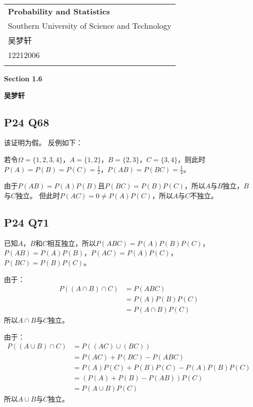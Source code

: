 \documentclass[a4paper,12pt]{ctexart}
\begin{document}
\thispagestyle{empty} %

\begin{tabular}{p{15.5cm}}
{\large \bf Probability and Statistics} \\
Southern University of Science and Technology \\ 吴梦轩 \\ 12212006 \\
\hline
\\
\end{tabular}

\vspace*{0.3cm} %

\begin{center}
	{\Large \bf Section 1.6}
	\vspace{2mm}

	{\bf 吴梦轩}
		
\end{center}  

\vspace{0.4cm}

\subsection*{P24 Q68}
该证明为假。
反例如下：

若令$\Omega = \{1,2,3,4\}$，$A = \{1,2\}$，$B = \{2,3\}$，$C = \{3,4\}$，则此时$P(A) = P(B) = P(C) = \frac{1}{2}$，$P(AB) = P(BC) = \frac{1}{4}$。

由于$P(AB) = P(A)P(B)$且$P(BC) = P(B)P(C)$，所以$A$与$B$独立，$B$与$C$独立。
但此时$P(AC) = 0 \neq P(A)P(C)$，所以$A$与$C$不独立。

\subsection*{P24 Q71}
已知$A$，$B$和$C$相互独立，所以$P(ABC) = P(A)P(B)P(C)$，$P(AB) = P(A)P(B)$，$P(AC) = P(A)P(C)$，$P(BC) = P(B)P(C)$。

由于：
\begin{align*}
	P((A\cap B)\cap C) &= P(ABC)\\
	&= P(A)P(B)P(C)\\
	&= P(A\cap B)P(C)
\end{align*}
所以$A\cap B$与$C$独立。

由于：
\begin{align*}
	P((A\cup B)\cap C) &= P((AC)\cup(BC))\\
	&= P(AC) + P(BC) - P(ABC)\\
	&= P(A)P(C) + P(B)P(C) - P(A)P(B)P(C)\\
	&= (P(A) + P(B) - P(AB))P(C)\\
	&= P(A\cup B)P(C)
\end{align*}
所以$A\cup B$与$C$独立。
\end{document}
